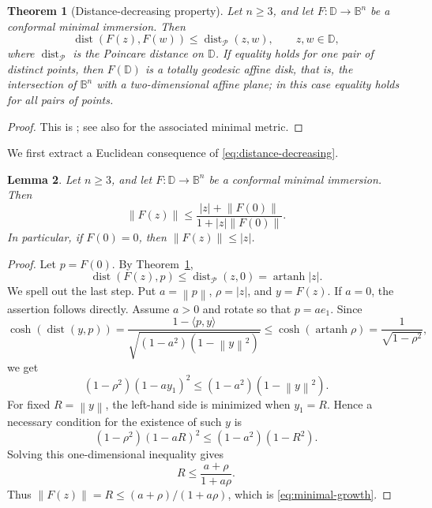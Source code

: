 \documentclass[11pt]{amsart}
\newtheorem{theorem}{Theorem}[section]
\newtheorem{lemma}[theorem]{Lemma}
\theoremstyle{definition}
\theoremstyle{remark}
\newcommand{\D}{\mathbb D}
\newcommand{\B}{\mathbb B}
\newcommand{\inner}[2]{\langle #1,#2\rangle}
\newcommand{\norm}[1]{\left\|#1\right\|}
\newcommand{\dist}{\operatorname{dist}}
\newcommand{\artanh}{\operatorname{artanh}}
\begin{document}
\begin{theorem}[Distance-decreasing property]\label{th:distance-decreasing}
Let \(n\ge3\), and let \(F:\D\to\B^n\) be a conformal minimal immersion. Then
\begin{equation}\label{eq:distance-decreasing}
        \dist(F(z),F(w))\le \dist_{\mathcal P}(z,w),
        \qquad z,w\in\D,
\end{equation}
where \(\dist_{\mathcal P}\) is the Poincare distance on \(\D\). If equality holds for one pair of distinct points, then \(F(\D)\) is a totally geodesic affine disk, that is, the intersection of \(\B^n\) with a two-dimensional affine plane; in this case equality holds for all pairs of points.
\end{theorem}

\begin{proof}
This is \cite[Theorem~1.4]{francdavid}; see also \cite{DrinovecDrnovsekForstneric2023} for the associated minimal metric.
\end{proof}

We first extract a Euclidean consequence of \eqref{eq:distance-decreasing}.

\begin{lemma}\label{lem:minimal-growth}
Let \(n\ge3\), and let \(F:\D\to\B^n\) be a conformal minimal immersion. Then
\begin{equation}\label{eq:minimal-growth}
        \norm{F(z)}
        \le
        \frac{|z|+\norm{F(0)}}{1+|z|\norm{F(0)}}.
\end{equation}
In particular, if \(F(0)=0\), then \(\norm{F(z)}\le |z|\).
\end{lemma}

\begin{proof}
Let \(p=F(0)\). By Theorem~\ref{th:distance-decreasing},
\[
        \dist(F(z),p)
        \le
        \dist_{\mathcal P}(z,0)
        =\artanh |z|.
\]
We spell out the last step. Put \(a=\norm p\), \(\rho=|z|\), and \(y=F(z)\). If \(a=0\), the assertion follows directly. Assume \(a>0\) and rotate so that \(p=ae_1\). Since
\[
        \cosh(\dist(y,p))
        =
        \frac{1-\inner{p}{y}}
        {\sqrt{(1-a^2)(1-\norm y^2)}}
        \le
        \cosh(\artanh\rho)=\frac1{\sqrt{1-\rho^2}},
\]
we get
\[
        (1-\rho^2)(1-a y_1)^2
        \le (1-a^2)(1-\norm y^2).
\]
For fixed \(R=\norm y\), the left-hand side is minimized when \(y_1=R\). Hence a necessary condition for the existence of such \(y\) is
\[
        (1-\rho^2)(1-aR)^2
        \le (1-a^2)(1-R^2).
\]
Solving this one-dimensional inequality gives
\[
        R\le \frac{a+\rho}{1+a\rho}.
\]
Thus \(\norm{F(z)}=R\le(a+\rho)/(1+a\rho)\), which is \eqref{eq:minimal-growth}.
\end{proof}
\end{document}
